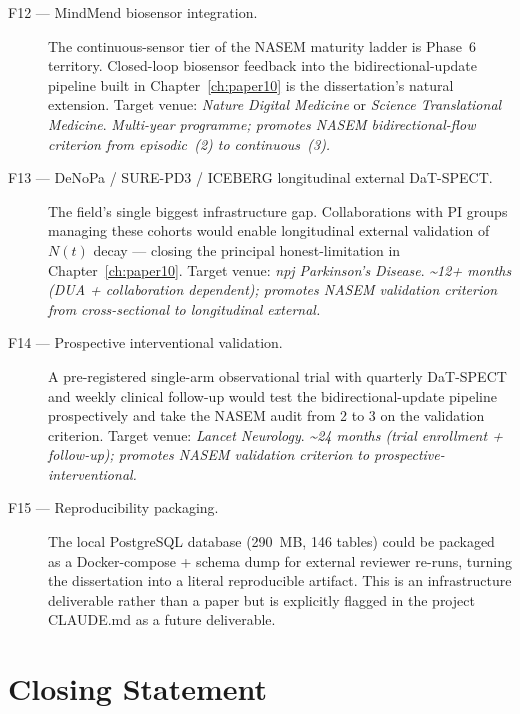 \begin{description}
  \item[F12 --- MindMend biosensor integration.] The continuous-sensor tier of the NASEM maturity ladder is Phase~6 territory. Closed-loop biosensor feedback into the bidirectional-update pipeline built in Chapter~\ref{ch:paper10} is the dissertation's natural extension. Target venue: \emph{Nature Digital Medicine} or \emph{Science Translational Medicine}. \emph{Multi-year programme; promotes NASEM bidirectional-flow criterion from episodic~(2) to continuous~(3).}

  \item[F13 --- DeNoPa / SURE-PD3 / ICEBERG longitudinal external DaT-SPECT.] The field's single biggest infrastructure gap. Collaborations with PI groups managing these cohorts would enable longitudinal external validation of $N(t)$ decay --- closing the principal honest-limitation in Chapter~\ref{ch:paper10}. Target venue: \emph{npj Parkinson's Disease}. \emph{\textasciitilde12+ months (DUA + collaboration dependent); promotes NASEM validation criterion from cross-sectional to longitudinal external.}

  \item[F14 --- Prospective interventional validation.] A pre-registered single-arm observational trial with quarterly DaT-SPECT and weekly clinical follow-up would test the bidirectional-update pipeline prospectively and take the NASEM audit from 2 to 3 on the validation criterion. Target venue: \emph{Lancet Neurology}. \emph{\textasciitilde24 months (trial enrollment + follow-up); promotes NASEM validation criterion to prospective-interventional.}

  \item[F15 --- Reproducibility packaging.] The local PostgreSQL database (290~MB, 146 tables) could be packaged as a Docker-compose + schema dump for external reviewer re-runs, turning the dissertation into a literal reproducible artifact. This is an infrastructure deliverable rather than a paper but is explicitly flagged in the project CLAUDE.md as a future deliverable.
\end{description}

\section{Closing Statement}
\label{sec:conc-closing}

